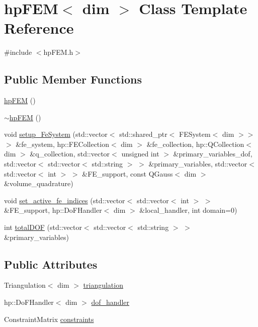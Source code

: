 \section{hp\+F\+EM$<$ dim $>$ Class Template Reference}
\label{classhp_f_e_m}


{\ttfamily \#include $<$hp\+F\+E\+M.\+h$>$}

\subsection*{Public Member Functions}
\begin{DoxyCompactItemize}
\item 
\mbox{\hyperlink{classhp_f_e_m_ac1540fdd371c0b89a90809251b618025}{hp\+F\+EM}} ()
\item 
\mbox{\hyperlink{classhp_f_e_m_acf426058508649734ee9618b5c9148c1}{$\sim$hp\+F\+EM}} ()
\item 
void \mbox{\hyperlink{classhp_f_e_m_afe86b756fb757221f5a8a16c956b7e76}{setup\+\_\+\+Fe\+System}} (std\+::vector$<$ std\+::shared\+\_\+ptr$<$ F\+E\+System$<$ dim $>$$>$ $>$ \&fe\+\_\+system, hp\+::\+F\+E\+Collection$<$ dim $>$ \&fe\+\_\+collection, hp\+::\+Q\+Collection$<$ dim $>$ \&q\+\_\+collection, std\+::vector$<$ unsigned int $>$ \&primary\+\_\+variables\+\_\+dof, std\+::vector$<$ std\+::vector$<$ std\+::string $>$ $>$ \&primary\+\_\+variables, std\+::vector$<$ std\+::vector$<$ int $>$ $>$ \&F\+E\+\_\+support, const Q\+Gauss$<$ dim $>$ \&volume\+\_\+quadrature)
\item 
void \mbox{\hyperlink{classhp_f_e_m_a12205240784051ad249a536cb7ee98d5}{set\+\_\+active\+\_\+fe\+\_\+indices}} (std\+::vector$<$ std\+::vector$<$ int $>$ $>$ \&F\+E\+\_\+support, hp\+::\+Do\+F\+Handler$<$ dim $>$ \&local\+\_\+handler, int domain=0)
\item 
int \mbox{\hyperlink{classhp_f_e_m_a9ceee3881af75e3be863fdb2d1688c0e}{total\+D\+OF}} (std\+::vector$<$ std\+::vector$<$ std\+::string $>$ $>$ \&primary\+\_\+variables)
\end{DoxyCompactItemize}
\subsection*{Public Attributes}
\begin{DoxyCompactItemize}
\item 
Triangulation$<$ dim $>$ \mbox{\hyperlink{classhp_f_e_m_a1e604d1e68926caf1ebc67d2a7451783}{triangulation}}
\item 
hp\+::\+Do\+F\+Handler$<$ dim $>$ \mbox{\hyperlink{classhp_f_e_m_ab4df20fb431f370878adc06e19280d62}{dof\+\_\+handler}}
\item 
Constraint\+Matrix \mbox{\hyperlink{classhp_f_e_m_aa08dcec4445eed1687b99cdb7b24b785}{constraints}}
\end{DoxyCompactItemize}


